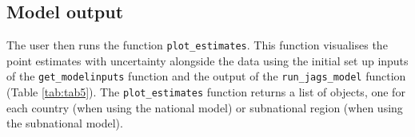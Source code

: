 \hypertarget{model-output}{%
\subsection{Model output}\label{model-output}}

The user then runs the function \texttt{plot\_estimates}. This function visualises the point estimates with uncertainty alongside the data using the initial set up inputs of the \texttt{get\_modelinputs} function and the output of the \texttt{run\_jags\_model} function (Table \ref{tab:tab5}). The \texttt{plot\_estimates} function returns a list of  objects, one for each country (when using the national model) or subnational region (when using the subnational model).

\begin{table}[]
\caption{The arguments of the plot\_estimates function. The purpose of this function is to plot the data alongside the model estimates so that users can visualise their estimated method supply shares. The argument name and data type of the argument is stated, a description of the argument is then provided. }
\label{tab:tab5}
\end{table}

